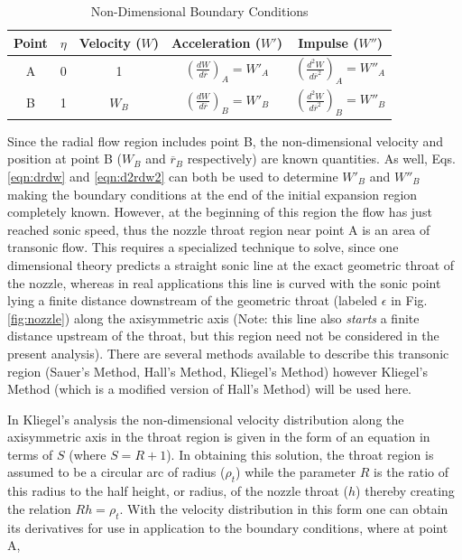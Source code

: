 \begin{table}[!h]
\begin{center}
\begin{threeparttable}

\caption{Non-Dimensional Boundary Conditions}

\begin{tabular}{ccccc}
\toprule
Point	& $\eta$&	Velocity ($W$)		&	Acceleration ($W'$) 	&	Impulse ($W''$)\\
\midrule
A	& 0&	1	& $(\frac{dW}{d\overline{r}})_A = W'_A$ & $(\frac{d^2W}{d\overline{r}^2})_A = W''_A$\\
B	& 1&	$W_B$	& $(\frac{dW}{d\overline{r}})_B = W'_B$ & $(\frac{d^2W}{d\overline{r}^2})_B = W''_B$\\
\bottomrule
\end{tabular}


\label{table:cpoly}
\end{threeparttable}
\end{center}
\end{table}	

	Since the radial flow region includes point B, the non-dimensional velocity and position at point
B ($W_B$ and $\overline{r}_B$ respectively) are known quantities.  As well, Eqs. \ref{eqn:drdw} 
and \ref{eqn:d2rdw2} can both be used to determine $W'_B$ and $W''_B$ making the boundary conditions
at the end of the initial expansion region completely known.  However, at the beginning of this region the 
flow has just reached sonic speed, thus the nozzle throat region near point A is an area of transonic flow.  
This requires a specialized technique to solve, since one dimensional theory predicts a straight sonic
line at the exact geometric throat of the nozzle, whereas in real applications this line is curved
with the sonic point lying a finite distance downstream of the geometric throat (labeled $\epsilon$ in
Fig. \ref{fig:nozzle}) along the axisymmetric axis (Note: this line also \emph{starts} a finite distance 
upstream of the throat, but this region need not be considered in the present analysis).  There are several 
methods available to describe this transonic region (Sauer's Method, Hall's Method, Kliegel's Method) however
Kliegel's Method (which is a modified version of Hall's Method) will be used here.  

	In Kliegel's analysis
the non-dimensional velocity distribution along the axisymmetric axis in the throat region is 
given in the form of an equation in terms of $S$ (where $S = R + 1$).  In obtaining this solution, the 
throat region is assumed to be a circular arc of radius ($\rho_t$) while the parameter $R$ is the ratio of 
this radius to the half height, or radius, of the nozzle throat ($h$) thereby creating the relation 
$Rh = \rho_t$.  With the velocity distribution in this form one can obtain its derivatives for use in 
application to the boundary conditions, where at point A,

